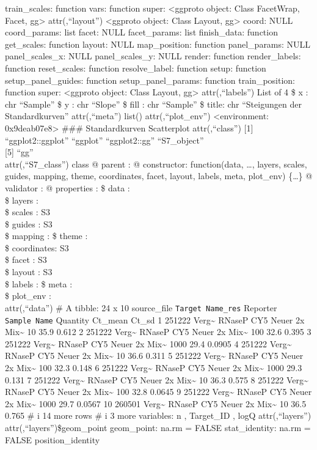 \documentclass[
]{article}
\begin{document}
train\_scales: function vars: function super: \textless ggproto object:
Class FacetWrap, Facet, gg\textgreater{} attr(,``layout'')
\textless ggproto object: Class Layout, gg\textgreater{} coord: NULL
coord\_params: list facet: NULL facet\_params: list finish\_data:
function get\_scales: function layout: NULL map\_position: function
panel\_params: NULL panel\_scales\_x: NULL panel\_scales\_y: NULL
render: function render\_labels: function reset\_scales: function
resolve\_label: function setup: function setup\_panel\_guides: function
setup\_panel\_params: function train\_position: function super:
\textless ggproto object: Class Layout, gg\textgreater{}
attr(,``labels'') List of 4 \$ x : chr ``Sample'' \$ y : chr ``Slope''
\$ fill : chr ``Sample'' \$ title: chr ``Steigungen der Standardkurven''
attr(,``meta'') list() attr(,``plot\_env'') \textless environment:
0x9deab07e8\textgreater{} \n\#\#\# Standardkurven Scatterplot \n\n
attr(,``class'') {[}1{]} ``ggplot2::ggplot'' ``ggplot'' ``ggplot2::gg''
``S7\_object''\\
{[}5{]} ``gg''\\
attr(,``S7\_class'') class @ parent : @ constructor: function(data,
\ldots, layers, scales, guides, mapping, theme, coordinates, facet,
layout, labels, meta, plot\_env) \{\ldots\} @ validator : @ properties :
\$ data : \\
\$ layers : \\
\$ scales : S3\\
\$ guides : S3\\
\$ mapping : \$ theme : \\
\$ coordinates: S3\\
\$ facet : S3\\
\$ layout : S3\\
\$ labels : \$ meta : \\
\$ plot\_env : \\
attr(,``data'') \# A tibble: 24 x 10 source\_file
\texttt{Target\ Name\_res} Reporter \texttt{Sample\ Name} Quantity
Ct\_mean Ct\_sd 1 251222 Verg\textasciitilde{} RNaseP CY5 Neuer 2x
Mix\textasciitilde{} 10 35.9 0.612 2 251222 Verg\textasciitilde{} RNaseP
CY5 Neuer 2x Mix\textasciitilde{} 100 32.6 0.395 3 251222
Verg\textasciitilde{} RNaseP CY5 Neuer 2x Mix\textasciitilde{} 1000 29.4
0.0905 4 251222 Verg\textasciitilde{} RNaseP CY5 Neuer 2x
Mix\textasciitilde{} 10 36.6 0.311 5 251222 Verg\textasciitilde{} RNaseP
CY5 Neuer 2x Mix\textasciitilde{} 100 32.3 0.148 6 251222
Verg\textasciitilde{} RNaseP CY5 Neuer 2x Mix\textasciitilde{} 1000 29.3
0.131 7 251222 Verg\textasciitilde{} RNaseP CY5 Neuer 2x
Mix\textasciitilde{} 10 36.3 0.575 8 251222 Verg\textasciitilde{} RNaseP
CY5 Neuer 2x Mix\textasciitilde{} 100 32.8 0.0645 9 251222
Verg\textasciitilde{} RNaseP CY5 Neuer 2x Mix\textasciitilde{} 1000 29.7
0.0567 10 260501 Verg\textasciitilde{} RNaseP CY5 Neuer 2x
Mix\textasciitilde{} 10 36.5 0.765 \# i 14 more rows \# i 3 more
variables: n , Target\_ID , logQ attr(,``layers'')
attr(,``layers'')\$geom\_point geom\_point: na.rm = FALSE
stat\_identity: na.rm = FALSE position\_identity
\end{document}
